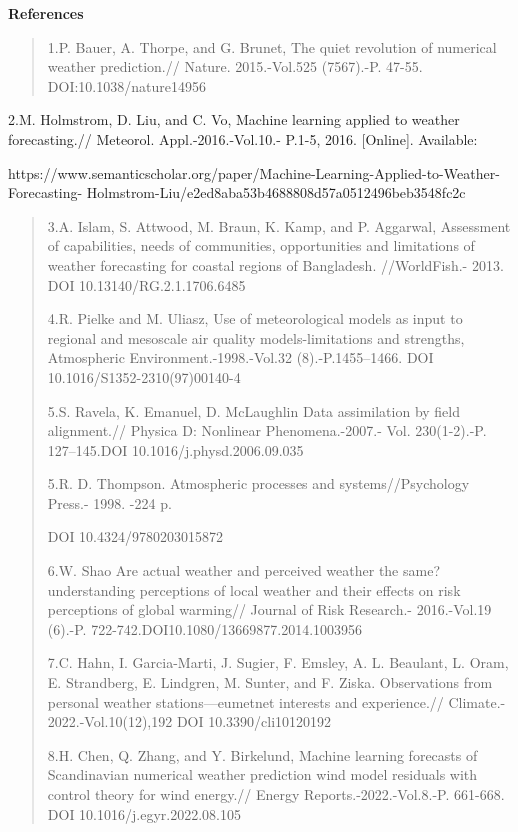 {\bfseries References}

\begin{quote}
1.P. Bauer, A. Thorpe, and G. Brunet, The quiet revolution of numerical
weather prediction.// Nature. 2015.-Vol.525 (7567).-P. 47-55.
DOI:10.1038/nature14956
\end{quote}

2.M. Holmstrom, D. Liu, and C. Vo, Machine learning applied to weather
forecasting.// Meteorol. Appl.-2016.-Vol.10.- P.1-5, 2016. {[}Online{]}.
Available:

https://www.semanticscholar.org/paper/Machine-Learning-Applied-to-Weather-Forecasting-
Holmstrom-Liu/e2ed8aba53b4688808d57a0512496beb3548fc2c

\begin{quote}
3.A. Islam, S. Attwood, M. Braun, K. Kamp, and P. Aggarwal, Assessment
of capabilities, needs of communities, opportunities and limitations of
weather forecasting for coastal regions of Bangladesh. //WorldFish.-
2013. DOI 10.13140/RG.2.1.1706.6485

4.R. Pielke and M. Uliasz, Use of meteorological models as input to
regional and mesoscale air quality models-limitations and strengths,
Atmospheric Environment.-1998.-Vol.32 (8).-P.1455--1466. DOI
10.1016/S1352-2310(97)00140-4

5.S. Ravela, K. Emanuel, D. McLaughlin Data assimilation by field
alignment.// Physica D: Nonlinear Phenomena.-2007.- Vol. 230(1-2).-P.
127--145.DOI 10.1016/j.physd.2006.09.035

5.R. D. Thompson. Atmospheric processes and systems//Psychology Press.-
1998. -224 p.

DOI 10.4324/9780203015872

6.W. Shao Are actual weather and perceived weather the same?
understanding perceptions of local weather and their effects on risk
perceptions of global warming// Journal of Risk Research.- 2016.-Vol.19
(6).-P. 722-742.DOI10.1080/13669877.2014.1003956

7.C. Hahn, I. Garcia-Marti, J. Sugier, F. Emsley, A. L. Beaulant, L.
Oram, E. Strandberg, E. Lindgren, M. Sunter, and F. Ziska. Observations
from personal weather stations---eumetnet interests and experience.//
Climate.- 2022.-Vol.10(12),192 DOI 10.3390/cli10120192

8.H. Chen, Q. Zhang, and Y. Birkelund, Machine learning forecasts of
Scandinavian numerical weather prediction wind model residuals with
control theory for wind energy.// Energy Reports.-2022.-Vol.8.-P.
661-668. DOI 10.1016/j.egyr.2022.08.105


\end{quote}
